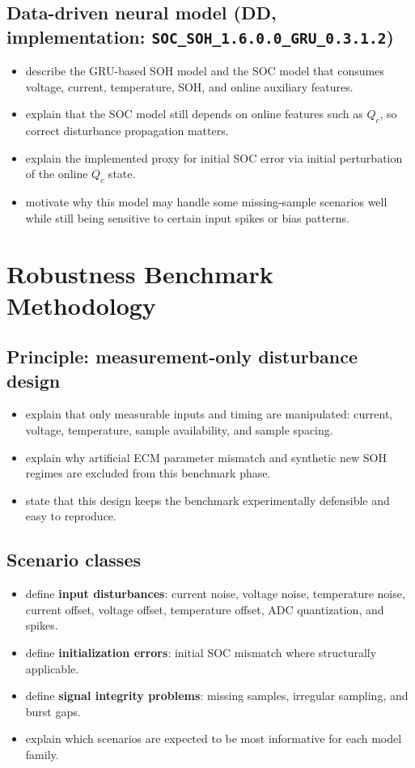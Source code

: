 \documentclass[review]{elsarticle}
\begin{document}
\subsection{Data-driven neural model (DD, implementation: \texttt{SOC\_SOH\_1.6.0.0\_GRU\_0.3.1.2})}
\begin{itemize}[leftmargin=*]
    \item describe the GRU-based SOH model and the SOC model that consumes voltage, current, temperature, SOH, and online auxiliary features.
    \item explain that the SOC model still depends on online features such as $Q_c$, so correct disturbance propagation matters.
    \item explain the implemented proxy for initial SOC error via initial perturbation of the online $Q_c$ state.
    \item motivate why this model may handle some missing-sample scenarios well while still being sensitive to certain input spikes or bias patterns.
\end{itemize}

\section{Robustness Benchmark Methodology}
\subsection{Principle: measurement-only disturbance design}
\begin{itemize}[leftmargin=*]
    \item explain that only measurable inputs and timing are manipulated: current, voltage, temperature, sample availability, and sample spacing.
    \item explain why artificial ECM parameter mismatch and synthetic new SOH regimes are excluded from this benchmark phase.
    \item state that this design keeps the benchmark experimentally defensible and easy to reproduce.
\end{itemize}

\subsection{Scenario classes}
\begin{itemize}[leftmargin=*]
    \item define \textbf{input disturbances}: current noise, voltage noise, temperature noise, current offset, voltage offset, temperature offset, ADC quantization, and spikes.
    \item define \textbf{initialization errors}: initial SOC mismatch where structurally applicable.
    \item define \textbf{signal integrity problems}: missing samples, irregular sampling, and burst gaps.
    \item explain which scenarios are expected to be most informative for each model family.
\end{itemize}
\end{document}

